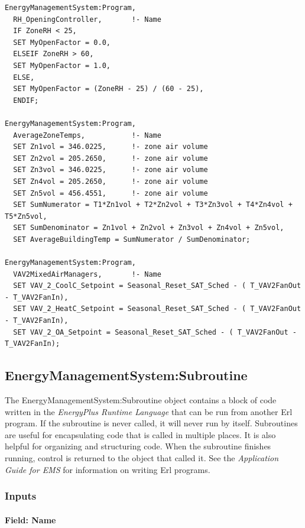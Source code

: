 \begin{lstlisting}
EnergyManagementSystem:Program,
  RH_OpeningController,       !- Name
  IF ZoneRH < 25,
  SET MyOpenFactor = 0.0,
  ELSEIF ZoneRH > 60,
  SET MyOpenFactor = 1.0,
  ELSE,
  SET MyOpenFactor = (ZoneRH - 25) / (60 - 25),
  ENDIF;

EnergyManagementSystem:Program,
  AverageZoneTemps,           !- Name
  SET Zn1vol = 346.0225,      !- zone air volume
  SET Zn2vol = 205.2650,      !- zone air volume
  SET Zn3vol = 346.0225,      !- zone air volume
  SET Zn4vol = 205.2650,      !- zone air volume
  SET Zn5vol = 456.4551,      !- zone air volume
  SET SumNumerator = T1*Zn1vol + T2*Zn2vol + T3*Zn3vol + T4*Zn4vol + T5*Zn5vol,
  SET SumDenominator = Zn1vol + Zn2vol + Zn3vol + Zn4vol + Zn5vol,
  SET AverageBuildingTemp = SumNumerator / SumDenominator;

EnergyManagementSystem:Program,
  VAV2MixedAirManagers,       !- Name
  SET VAV_2_CoolC_Setpoint = Seasonal_Reset_SAT_Sched - ( T_VAV2FanOut - T_VAV2FanIn),
  SET VAV_2_HeatC_Setpoint = Seasonal_Reset_SAT_Sched - ( T_VAV2FanOut - T_VAV2FanIn),
  SET VAV_2_OA_Setpoint = Seasonal_Reset_SAT_Sched - ( T_VAV2FanOut - T_VAV2FanIn);
\end{lstlisting}

\subsection{EnergyManagementSystem:Subroutine}\label{energymanagementsystemsubroutine}

The EnergyManagementSystem:Subroutine object contains a block of code written in the \emph{EnergyPlus Runtime Language} that can be run from another Erl program. If the subroutine is never called, it will never run by itself. Subroutines are useful for encapsulating code that is called in multiple places. It is also helpful for organizing and structuring code. When the subroutine finishes running, control is returned to the object that called it. See the \emph{Application Guide for EMS} for information on writing Erl programs.

\subsubsection{Inputs}\label{inputs-4-010}

\paragraph{Field: Name}\label{field-name-4-009}

